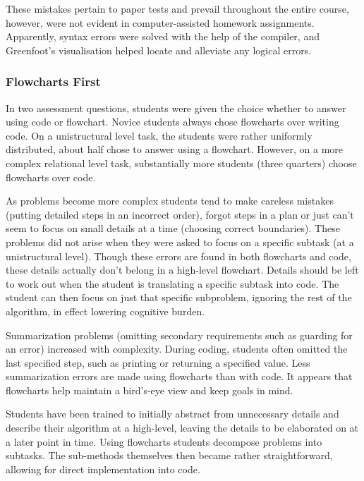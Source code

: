 These mistakes pertain to paper tests and prevail throughout the entire
course, however, were not evident in computer-assisted homework assignments.
Apparently, syntax errors were solved with the help of the compiler, and
Greenfoot's visualisation helped locate and alleviate any logical errors.





\subsubsection*{Flowcharts First}

In two assessment questions, students were given the choice whether to answer
using code or flowchart. Novice students always chose flowcharts over writing
code. On a unistructural level task, the students were rather uniformly
distributed, about half chose to answer using a flowchart. However, on a more
complex relational level task, substantially more students (three quarters)
choose flowcharts over code.

As problems become more complex students tend to make careless mistakes
(putting detailed steps in an incorrect order), forgot steps in a plan or
just can't seem to focus on small details at a time (choosing correct
boundaries). These problems did not arise when they were asked to focus on a
specific subtask (at a unistructural level). Though these errors are found in
both flowcharts and code, these details actually don't belong in a high-level
flowchart. Details should be left to work out when the student is translating
a specific subtask into code. The student can then focus on just that
specific subproblem, ignoring the rest of the algorithm, in effect lowering
cognitive burden.



Summarization problems (omitting secondary requirements such as guarding for
an error) increased with complexity. During coding, students often omitted
the last specified step, such as printing or returning a specified value.
Less summarization errors are made using flowcharts than with code. It
appears that flowcharts help maintain a bird's-eye view and keep goals in
mind.





Students have been trained to initially abstract from unnecessary details and
describe their algorithm at a high-level, leaving the details to be
elaborated on at a later point in time. Using flowcharts students decompose
problems into subtasks. The sub-methods themselves then became rather
straightforward, allowing for direct implementation into code.


